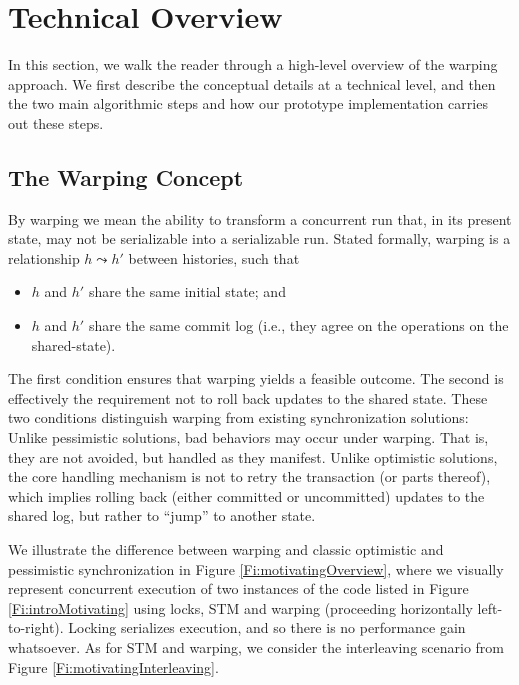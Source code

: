 \section{Technical Overview}

In this section, we walk the reader through a high-level overview of the warping approach. We first describe the conceptual details at a technical level, and then the two main algorithmic steps and how our prototype implementation carries out these steps.

\subsection{The Warping Concept}

By warping we mean the ability to transform a concurrent run that, in its present state, may not be serializable into a serializable run. Stated formally, warping is a relationship $h \leadsto h'$ between histories, such that
\begin{itemize}
	\item $h$ and $h'$ share the same initial state; and
	\item $h$ and $h'$ share the same commit log (i.e., they agree on the operations on the shared-state).
\end{itemize} 

The first condition ensures that warping yields a feasible outcome. The second is effectively the requirement not to roll back updates to the shared state. These two conditions distinguish warping from existing synchronization solutions: Unlike pessimistic solutions, bad behaviors may occur under warping. That is, they are not avoided, but handled as they manifest. Unlike optimistic solutions, the core handling mechanism is not to retry the transaction (or parts thereof), which implies rolling back (either committed or uncommitted) updates to the shared log, but rather to ``jump'' to another state.

We illustrate the difference between warping and classic optimistic and pessimistic synchronization in Figure \ref{Fi:motivatingOverview}, where we visually represent concurrent execution of two instances of the code listed in Figure \ref{Fi:introMotivating} using locks, STM and warping (proceeding horizontally left-to-right). Locking serializes execution, and so there is no performance gain whatsoever. As for STM and warping, we consider the interleaving scenario from Figure \ref{Fi:motivatingInterleaving}. 

